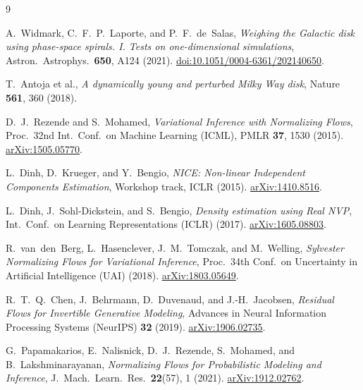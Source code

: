 \documentclass[11pt]{article}
\begin{document}
\begin{thebibliography}{9}

A.~Widmark, C.~F.~P.~Laporte, and P.~F.~de~Salas,
\emph{Weighing the Galactic disk using phase-space spirals. I. Tests on
one-dimensional simulations},
Astron.\ Astrophys.\ \textbf{650}, A124 (2021).
\href{https://doi.org/10.1051/0004-6361/202140650}{doi:10.1051/0004-6361/202140650}.

T.~Antoja et al.,
\emph{A dynamically young and perturbed Milky Way disk},
Nature \textbf{561}, 360 (2018).

D.~J.~Rezende and S.~Mohamed,
\emph{Variational Inference with Normalizing Flows},
Proc.\ 32nd Int.\ Conf.\ on Machine Learning (ICML), PMLR \textbf{37}, 1530
(2015). \href{https://arxiv.org/abs/1505.05770}{arXiv:1505.05770}.

L.~Dinh, D.~Krueger, and Y.~Bengio,
\emph{NICE: Non-linear Independent Components Estimation},
Workshop track, ICLR (2015). \href{https://arxiv.org/abs/1410.8516}{arXiv:1410.8516}.

L.~Dinh, J.~Sohl-Dickstein, and S.~Bengio,
\emph{Density estimation using Real NVP},
Int.\ Conf.\ on Learning Representations (ICLR) (2017).
\href{https://arxiv.org/abs/1605.08803}{arXiv:1605.08803}.

R.~van~den~Berg, L.~Hasenclever, J.~M.~Tomczak, and M.~Welling,
\emph{Sylvester Normalizing Flows for Variational Inference},
Proc.\ 34th Conf.\ on Uncertainty in Artificial Intelligence (UAI) (2018).
\href{https://arxiv.org/abs/1803.05649}{arXiv:1803.05649}.

R.~T.~Q.~Chen, J.~Behrmann, D.~Duvenaud, and J.-H.~Jacobsen,
\emph{Residual Flows for Invertible Generative Modeling},
Advances in Neural Information Processing Systems (NeurIPS) \textbf{32}
(2019). \href{https://arxiv.org/abs/1906.02735}{arXiv:1906.02735}.

G.~Papamakarios, E.~Nalisnick, D.~J.~Rezende, S.~Mohamed, and
B.~Lakshminarayanan,
\emph{Normalizing Flows for Probabilistic Modeling and Inference},
J.\ Mach.\ Learn.\ Res.\ \textbf{22}(57), 1 (2021).
\href{https://arxiv.org/abs/1912.02762}{arXiv:1912.02762}.

\end{thebibliography}
\end{document}
